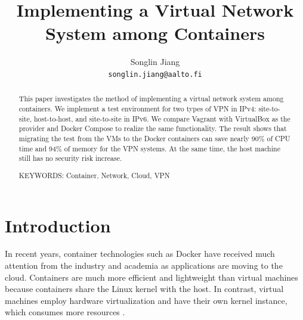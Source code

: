 \documentclass[article]{aaltoseries}
\begin{document}
 

\title{Implementing a Virtual Network System among Containers}

\author{Songlin Jiang%
\\\textnormal{\texttt{songlin.jiang@aalto.fi}}} %


\maketitle


\begin{abstract}
This paper investigates the method of implementing a virtual network system among containers. We implement a test environment for two types of VPN in IPv4: site-to-site, host-to-host, and site-to-site in IPv6. We compare Vagrant with VirtualBox as the provider and Docker Compose to realize the same functionality. The result shows that migrating the test from the VMs to the Docker containers can save nearly 90\% of CPU time and 94\% of memory for the VPN systems. At the same time, the host machine still has no security risk increase.

\vspace{3mm}
\noindent KEYWORDS: Container, Network, Cloud, VPN

\end{abstract}




\section{Introduction}

In recent years, container technologies such as Docker have received much attention from the industry and academia as applications are moving to the cloud. Containers are much more efficient and lightweight than virtual machines because containers share the Linux kernel with the host. In contrast, virtual machines employ hardware virtualization and have their own kernel instance, which consumes more resources \cite{10.1145/2988336.2988337}.
\end{document}
